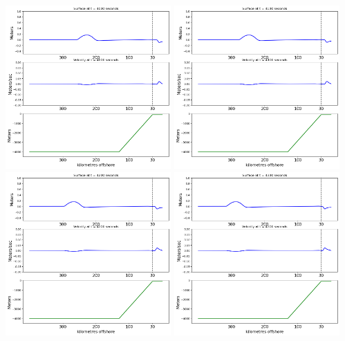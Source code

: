 \documentclass[11pt]{article}
\begin{document}
\vskip 10pt 
\includegraphics[width=0.475\textwidth]{frame0040fig2.png}
\vskip 10pt 
\includegraphics[width=0.475\textwidth]{frame0041fig2.png}
\vskip 10pt 
\includegraphics[width=0.475\textwidth]{frame0042fig2.png}
\vskip 10pt 
\includegraphics[width=0.475\textwidth]{frame0043fig2.png}
\end{document}

